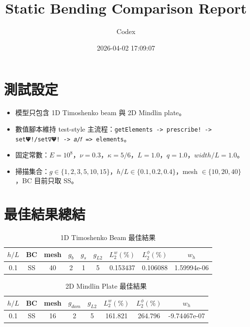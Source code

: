 \documentclass[12pt]{ctexart}
\title{Static Bending Comparison Report}
\author{Codex}
\date{2026-04-02 17:09:07}
\begin{document}
\maketitle

\section*{測試設定}
\begin{itemize}
\item 模型只包含 1D Timoshenko beam 與 2D Mindlin plate。
\item 數值腳本維持 test-style 主流程：\texttt{getElements -> prescribe! -> set𝝭!/set∇𝝭! -> 𝑎/𝑓 => elements}。
\item 固定常數：$E=10^8$，$\nu=0.3$，$\kappa=5/6$，$L=1.0$，$q=1.0$，$width/L=1.0$。
\item 掃描集合：$g \in \{1,2,3,5,10,15\}$，$h/L \in \{0.1,0.2,0.4\}$，mesh $\in \{10,20,40\}$，BC 目前只取 SS。
\end{itemize}

\section*{最佳結果總結}
\begin{table}[htbp]
\centering
\caption{1D Timoshenko Beam 最佳結果}
\begin{tabular}{ccccccccc}
\toprule
$h/L$ & BC & mesh & $g_b$ & $g_s$ & $g_{L2}$ & $L_2^w(\%)$ & $L_2^\phi(\%)$ & $w_h$ \\
\midrule
0.1 & SS & 40 & 2 & 1 & 5 & 0.153437 & 0.106088 & 1.59994e-06 \\
\bottomrule
\end{tabular}
\end{table}

\begin{table}[htbp]
\centering
\caption{2D Mindlin Plate 最佳結果}
\begin{tabular}{cccccccc}
\toprule
$h/L$ & BC & mesh & $g_{dom}$ & $g_{L2}$ & $L_2^w(\%)$ & $L_2^\phi(\%)$ & $w_h$ \\
\midrule
0.1 & SS & 16 & 2 & 5 & 161.821 & 264.796 & -9.74467e-07 \\
\bottomrule
\end{tabular}
\end{table}
\end{document}
